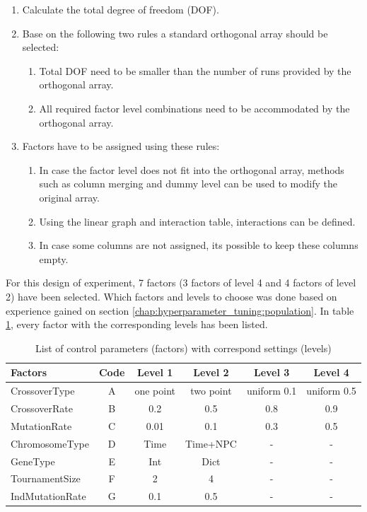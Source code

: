 \begin{enumerate}
	\item Calculate the total degree of freedom (DOF). 
	\item Base on the following two rules a standard orthogonal array should be selected:
	\begin{enumerate}
		\item Total DOF need to be smaller than the number of runs provided by the orthogonal array.
		\item All required factor level combinations need to be accommodated by the orthogonal array.
	\end{enumerate}
	
	\item Factors have to be assigned using these rules: 
	\begin{enumerate}
		\item In case the factor level does not fit into the orthogonal array, methods such as column merging and dummy level can be used to modify the original array.
		\item Using the linear graph and interaction table, interactions can be defined. 
		\item In case some columns are not assigned, its possible to keep these columns empty.
	\end{enumerate}
\end{enumerate}

For this design of experiment, 7 factors (3 factors of level 4 and 4 factors of level 2) have been selected. Which factors and levels to choose was done based on experience gained on section \ref{chap:hyperparameter_tuning:population}. In table \ref{table:hyperparameter_tuning:settings_to_level}, every factor with the corresponding levels has been listed.

\begin{table}[h]
	\label{table:hyperparameter_tuning:settings_to_level}
	\centering
\begin{tabular}{ l|c|cccc }
	\hline
	Factors & Code & Level 1 & Level 2 & Level 3 & Level 4\\
	\hline
	CrossoverType 		& A & one point & two point & uniform 0.1 & uniform 0.5\\
	CrossoverRate    	& B & 0.2 & 0.5 & 0.8 & 0.9\\
	MutationRate   		& C & 0.01 & 0.1 & 0.3 & 0.5\\
	ChromosomeType   	& D & Time & Time+NPC & - & -\\
	GeneType			& E & Int & Dict & - & -\\
	TournamentSize 		& F & 2 & 4 & - & -\\
	IndMutationRate		& G & 0.1 & 0.5 & - & -\\
	\hline
\end{tabular}
\caption{List of control parameters (factors) with correspond settings (levels)}
\end{table}

